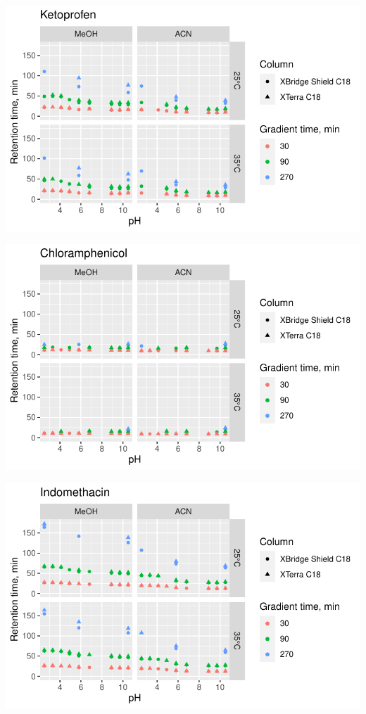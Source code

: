 \documentclass[
  letterpaper,
  DIV=11,
  numbers=noendperiod]{scrreprt}
\begin{document}
\includegraphics{index_files/figure-pdf/unnamed-chunk-4-105.pdf}

\includegraphics{index_files/figure-pdf/unnamed-chunk-4-106.pdf}

\includegraphics{index_files/figure-pdf/unnamed-chunk-4-107.pdf}
\end{document}
